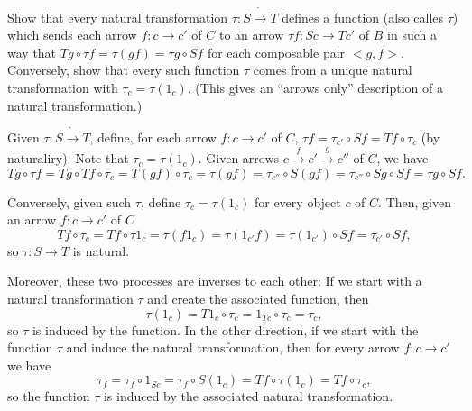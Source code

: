 \begin{exercise}
Show that every natural transformation $\tau:S\dot{\to} T$ defines a function (also calles $\tau$) which sends each arrow $f:c\to c'$ of $C$ to an arrow $\tau f:Sc\to Tc'$ of $B$ in such a way that $Tg\circ\tau f=\tau(gf)=\tau g\circ Sf$ for each composable pair $<g,f>$. Conversely, show that every such function $\tau$ comes from a unique natural transformation with $\tau_c=\tau(1_c)$. (This gives an ``arrows only'' description of a natural transformation.)
\end{exercise}
\begin{solution}
Given $\tau:S\dot{\to} T$, define, for each arrow $f:c\to c'$ of $C$, $\tau f=\tau_{c'}\circ Sf=Tf\circ\tau_c$ (by naturaliry). Note that $\tau_c=\tau(1_c)$. Given arrows $c\overset{f}{\to}c'\overset{g}{\to}c''$ of $C$, we have
\[Tg\circ\tau f=Tg\circ Tf\circ \tau_c=T(gf)\circ\tau_c=\tau(gf)=\tau_{c''}\circ S(gf)=\tau_{c''}\circ Sg\circ Sf=\tau g\circ Sf.\]

Conversely, given such $\tau$, define $\tau_c=\tau(1_c)$ for every object $c$ of $C$. Then, given an arrow $f:c\to c'$ of $C$
\[Tf\circ\tau_c=Tf\circ\tau 1_c=\tau(f1_c)=\tau(1_{c'}f)=\tau(1_{c'})\circ Sf=\tau_{c'}\circ Sf,\]
so $\tau:S\to T$ is natural.

Moreover, these two processes are inverses to each other: If we start with a natural transformation $\tau$ and create the associated function, then \[\tau(1_c)=T1_c\circ\tau_c=1_{Tc}\circ\tau_c=\tau_c,\]
so $\tau$ is induced by the function. In the other direction, if we start with the function $\tau$ and induce the natural transformation, then for every arrow $f\colon c\to c'$ we have
\[\tau_f=\tau_f\circ 1_{Sc}=\tau_f\circ S(1_c)=Tf\circ \tau(1_c)=Tf\circ\tau_c,\]
so the function $\tau$ is induced by the associated natural transformation.
\end{solution}

